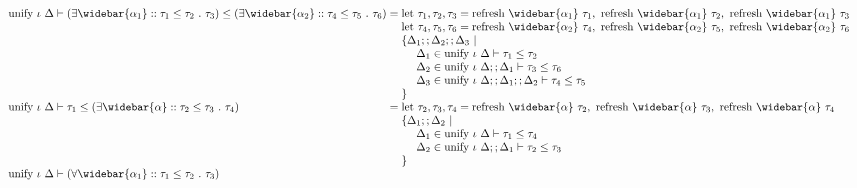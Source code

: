 \documentclass[sigplan,screen]{acmart}
\begin{document}
\begin{figure*}[h]
  \[
    \begin{array}{l @{} l}
      \text{unify } \iota\ \Delta \vdash
      (\exists \widebar{\alpha_1} :: \tau_1 \leq \tau_2\ .\ \tau_3)
      \leq 
      (\exists \widebar{\alpha_2} :: \tau_4 \leq \tau_5\ .\ \tau_6)
      &{} = 
      \begin{array}[t]{@{} l}
        \text{let } \tau_1, \tau_2, \tau_3 = 
        \text{refresh } \widebar{\alpha_1}\ \tau_1,\ 
        \text{refresh } \widebar{\alpha_1}\ \tau_2,\ 
        \text{refresh } \widebar{\alpha_1}\ \tau_3
        \\
        \text{let } \tau_4, \tau_5, \tau_6 = 
        \text{refresh } \widebar{\alpha_2}\ \tau_4,\ 
        \text{refresh } \widebar{\alpha_2}\ \tau_5,\ 
        \text{refresh } \widebar{\alpha_2}\ \tau_6
        \\
        \{\Delta_1;;\Delta_2;;\Delta_3\ |
        \\ 
        \ \ \ \ \Delta_1 \in \text{unify } \iota\ \Delta \vdash \tau_1 \leq \tau_2
        \\ 
        \ \ \ \ \Delta_2 \in \text{unify } \iota\ \Delta;;\Delta_1 \vdash \tau_3 \leq \tau_6
        \\
        \ \ \ \ \Delta_3 \in \text{unify } \iota\ \Delta;;\Delta_1;;\Delta_2 \vdash \tau_4 \leq \tau_5
        \\
        \}
      \end{array}
      \\
      \text{unify } \iota\ \Delta \vdash
      \tau_1
      \leq 
      (\exists \widebar{\alpha} :: \tau_2 \leq \tau_3\ .\ \tau_4)
      &{} = 
      \begin{array}[t]{@{} l}
        \text{let } \tau_2, \tau_3, \tau_4 = 
        \text{refresh } \widebar{\alpha}\ \tau_2,\ 
        \text{refresh } \widebar{\alpha}\ \tau_3,\ 
        \text{refresh } \widebar{\alpha}\ \tau_4
        \\
        \{\Delta_1;;\Delta_2\ |
        \\ 
        \ \ \ \ \Delta_1 \in \text{unify } \iota\ \Delta \vdash \tau_1 \leq \tau_4
        \\
        \ \ \ \ \Delta_2 \in \text{unify } \iota\ \Delta;;\Delta_1 \vdash \tau_2 \leq \tau_3
        \\
        \}
      \end{array}
      \\
      \text{unify } \iota\ \Delta \vdash
      (\forall \widebar{\alpha_1} :: \tau_1 \leq \tau_2\ .\ \tau_3)

\end{array}\]
\end{figure*}
\end{document}
